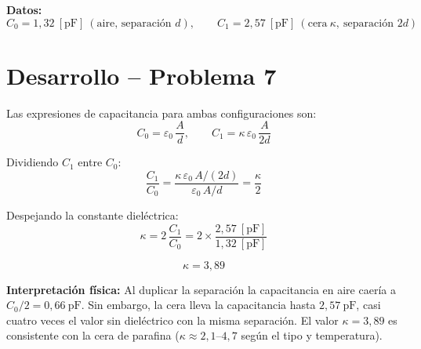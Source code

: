 \documentclass[12pt,letterpaper]{article}
\begin{document}
\medskip
\noindent\textbf{Datos:}
\[
    C_0 = 1{,}32\ [\text{pF}]\ (\text{aire, separaci\'on }d),\qquad
    C_1 = 2{,}57\ [\text{pF}]\ (\text{cera}\ \kappa,\ \text{separaci\'on }2d)
\]

\begin{center}
\end{center}

\section*{Desarrollo -- Problema 7}

Las expresiones de capacitancia para ambas configuraciones son:
\[
    C_0 = \varepsilon_0\,\frac{A}{d},\qquad C_1 = \kappa\,\varepsilon_0\,\frac{A}{2d}
\]

Dividiendo $C_1$ entre $C_0$:
\[
    \frac{C_1}{C_0} = \frac{\kappa\,\varepsilon_0\,A/(2d)}{\varepsilon_0\,A/d} = \frac{\kappa}{2}
\]

Despejando la constante diel\'ectrica:
\[
    \kappa = 2\,\frac{C_1}{C_0} = 2\times\frac{2{,}57\ [\text{pF}]}{1{,}32\ [\text{pF}]}
\]

\[
    \boxed{\kappa = 3{,}89}
\]

\noindent\textbf{Interpretaci\'on f\'isica:} Al duplicar la separaci\'on la capacitancia en aire caer\'ia a $C_0/2 = 0{,}66\ \text{pF}$. Sin embargo, la cera lleva la capacitancia hasta $2{,}57\ \text{pF}$, casi cuatro veces el valor sin diel\'ectrico con la misma separaci\'on. El valor $\kappa = 3{,}89$ es consistente con la cera de parafina ($\kappa \approx 2{,}1$--$4{,}7$ seg\'un el tipo y temperatura).
\end{document}
